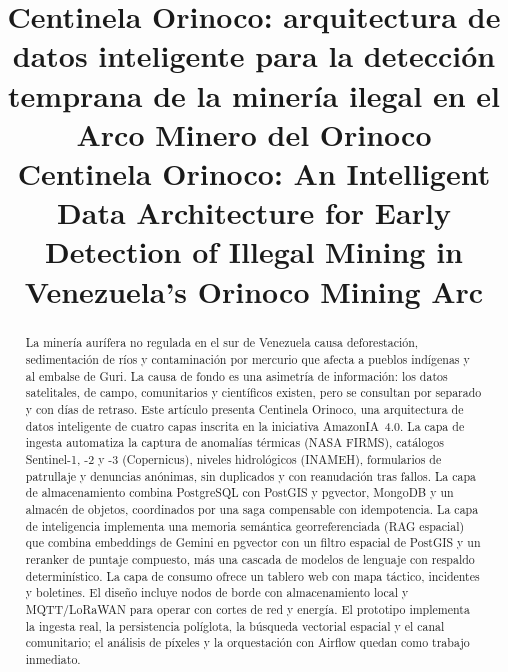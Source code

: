 \documentclass[conference]{IEEEtran}
\begin{document}
\title{Centinela Orinoco: arquitectura de datos inteligente para la detección temprana de la minería ilegal en el Arco Minero del Orinoco\\
\large Centinela Orinoco: An Intelligent Data Architecture for Early Detection of Illegal Mining in Venezuela's Orinoco Mining Arc}

\author{
}

\maketitle

\begin{abstract}
La minería aurífera no regulada en el sur de Venezuela causa deforestación, sedimentación de ríos y contaminación por mercurio que afecta a pueblos indígenas y al embalse de Guri. La causa de fondo es una asimetría de información: los datos satelitales, de campo, comunitarios y científicos existen, pero se consultan por separado y con días de retraso. Este artículo presenta Centinela Orinoco, una arquitectura de datos inteligente de cuatro capas inscrita en la iniciativa AmazonIA~4.0. La capa de ingesta automatiza la captura de anomalías térmicas (NASA FIRMS), catálogos Sentinel-1, -2 y -3 (Copernicus), niveles hidrológicos (INAMEH), formularios de patrullaje y denuncias anónimas, sin duplicados y con reanudación tras fallos. La capa de almacenamiento combina PostgreSQL con PostGIS y pgvector, MongoDB y un almacén de objetos, coordinados por una saga compensable con idempotencia. La capa de inteligencia implementa una memoria semántica georreferenciada (RAG espacial) que combina embeddings de Gemini en pgvector con un filtro espacial de PostGIS y un reranker de puntaje compuesto, más una cascada de modelos de lenguaje con respaldo determinístico. La capa de consumo ofrece un tablero web con mapa táctico, incidentes y boletines. El diseño incluye nodos de borde con almacenamiento local y MQTT/LoRaWAN para operar con cortes de red y energía. El prototipo implementa la ingesta real, la persistencia políglota, la búsqueda vectorial espacial y el canal comunitario; el análisis de píxeles y la orquestación con Airflow quedan como trabajo inmediato.
\end{abstract}
\end{document}
